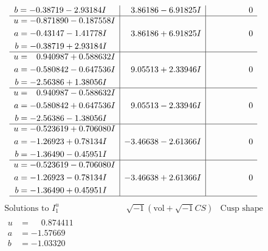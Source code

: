 \documentclass[1p]{elsarticle_modified}
\theoremstyle{definition}
\newcommand{\I}{\sqrt{-1}}
\begin{document}
$$\begin{array}{c|c|c}
\begin{aligned}
b &= -0.38719 - 2.93184 I\end{aligned}
 & \phantom{-}3.86186 - 6.91825 I & \phantom{-0.000000 } 0 \\ \hline\begin{aligned}
u &= -0.871890 - 0.187558 I \\
a &= -0.43147 - 1.41778 I \\
b &= -0.38719 + 2.93184 I\end{aligned}
 & \phantom{-}3.86186 + 6.91825 I & \phantom{-0.000000 } 0 \\ \hline\begin{aligned}
u &= \phantom{-}0.940987 + 0.588632 I \\
a &= -0.580842 - 0.647536 I \\
b &= -2.56386 + 1.38056 I\end{aligned}
 & \phantom{-}9.05513 + 2.33946 I & \phantom{-0.000000 } 0 \\ \hline\begin{aligned}
u &= \phantom{-}0.940987 - 0.588632 I \\
a &= -0.580842 + 0.647536 I \\
b &= -2.56386 - 1.38056 I\end{aligned}
 & \phantom{-}9.05513 - 2.33946 I & \phantom{-0.000000 } 0 \\ \hline\begin{aligned}
u &= -0.523619 + 0.706080 I \\
a &= -1.26923 + 0.78134 I \\
b &= -1.36490 - 0.45951 I\end{aligned}
 & -3.46638 - 2.61366 I & \phantom{-0.000000 } 0 \\ \hline\begin{aligned}
u &= -0.523619 - 0.706080 I \\
a &= -1.26923 - 0.78134 I \\
b &= -1.36490 + 0.45951 I\end{aligned}
 & -3.46638 + 2.61366 I & \phantom{-0.000000 } 0\\
 \hline 
 \end{array}$$\newpage$$\begin{array}{c|c|c}  
\text{Solutions to }I^u_{1}& \I (\text{vol} + \sqrt{-1}CS) & \text{Cusp shape}\\
 \hline 
\begin{aligned}
u &= \phantom{-}0.874411\phantom{ +0.000000I} \\
a &= -1.57669\phantom{ +0.000000I} \\
b &= -1.03320\phantom{ +0.000000I}\end{aligned}

\end{array}$$
\end{document}
